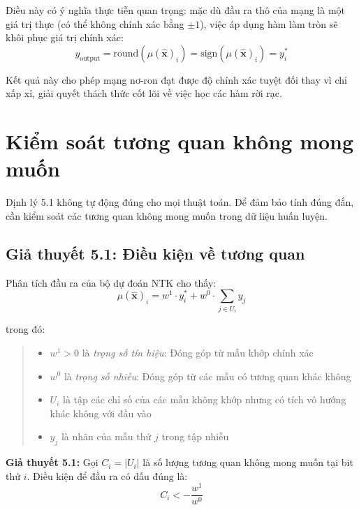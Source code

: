 Điều này có ý nghĩa thực tiễn quan trọng: mặc dù đầu ra thô của mạng là một giá trị thực (có thể không chính xác bằng $\pm 1$), việc áp dụng hàm làm tròn sẽ khôi phục giá trị chính xác:
\begin{equation}
    y_{\text{output}} = \text{round}(\mu(\hat{\mathbf{x}})_i) = \text{sign}(\mu(\hat{\mathbf{x}})_i) = y_i^*
\end{equation}

Kết quả này cho phép mạng nơ-ron đạt được độ chính xác tuyệt đối thay vì chỉ xấp xỉ, giải quyết thách thức cốt lõi về việc học các hàm rời rạc.

\section{Kiểm soát tương quan không mong muốn}

Định lý 5.1 không tự động đúng cho mọi thuật toán. Để đảm bảo tính đúng đắn, cần kiểm soát các tương quan không mong muốn trong dữ liệu huấn luyện.

\subsection{Giả thuyết 5.1: Điều kiện về tương quan}

Phân tích đầu ra của bộ dự đoán NTK cho thấy:
\begin{equation}
    \mu(\hat{\mathbf{x}})_i = w^1 \cdot y_i^* + w^0 \cdot \sum_{j \in U_i} y_j
\end{equation}

trong đó:
\begin{quote}
\begin{itemize}
    \item $w^1 > 0$ là \textit{trọng số tín hiệu}: Đóng góp từ mẫu khớp chính xác
    \item $w^0$ là \textit{trọng số nhiễu}: Đóng góp từ các mẫu có tương quan khác không
    \item $U_i$ là tập các chỉ số của các mẫu không khớp nhưng có tích vô hướng khác không với đầu vào
    \item $y_j$ là nhãn của mẫu thứ $j$ trong tập nhiễu
\end{itemize}
\end{quote}

        \textbf{Giả thuyết 5.1:} Gọi $C_i = |U_i|$ là số lượng tương quan không mong muốn tại bit thứ $i$. Điều kiện để đầu ra có dấu đúng là:
\begin{equation}
    C_i < -\frac{w^1}{w^0}
\end{equation}

